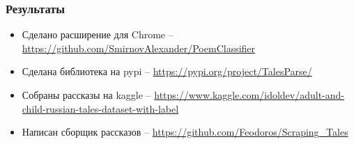 \documentclass[xetex,mathserif,serif]{beamer}
\begin{document}
	\begin{frame}
		\frametitle{Результаты}
		\begin{itemize}
			\item Сделано расширение для Chrome – \url{https://github.com/SmirnovAlexander/PoemClassifier}
			\item Сделана библиотека на pypi – \url{https://pypi.org/project/TalesParse/}
			\item Собраны рассказы на kaggle – \url{https://www.kaggle.com/idoldev/adult-and-child-russian-tales-dataset-with-label}
			\item Написан сборщик рассказов – \url{https://github.com/Feodoros/Scraping_Tales}
		\end{itemize}
	\end{frame}
\end{document}
